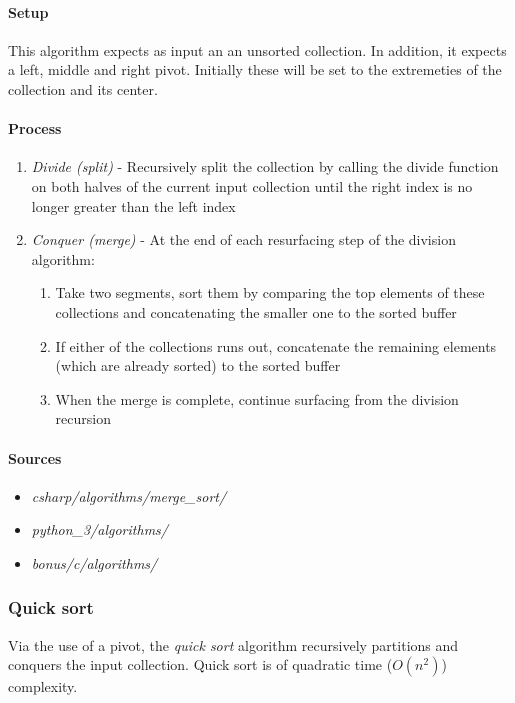 \documentclass{article}
\begin{document}
\paragraph{Setup}
This algorithm expects as input an an unsorted collection. In addition, it expects a left, middle and right pivot.
Initially these will be set to the extremeties of the collection and its center.

\paragraph{Process}
\begin{enumerate}
\item{{\em Divide (split)} - Recursively split the collection by calling the divide function on both halves of the
current input collection until the right index is no longer greater than the left index}
\item{{\em Conquer (merge)} - At the end of each resurfacing step of the division algorithm:}
  \begin{enumerate}
  \item{Take two segments, sort them by comparing the top elements of these collections and concatenating the smaller
    one to the sorted buffer}
  \item{If either of the collections runs out, concatenate the remaining elements (which are already sorted) to the
    sorted buffer}
  \item{When the merge is complete, continue surfacing from the division recursion}
  \end{enumerate}
\end{enumerate}

\begin{samepage}
  \paragraph{Sources}
  \begin{itemize}
  \item{{\em csharp/algorithms/merge\_sort/}}
  \item{{\em python\_3/algorithms/}}
  \item{{\em bonus/c/algorithms/}}
  \end{itemize}
\end{samepage}


\subsubsection{Quick sort}
Via the use of a pivot, the {\em quick sort} algorithm recursively partitions and conquers the input collection.
Quick sort is of quadratic time (\(O(n^2)\)) complexity.
\end{document}
